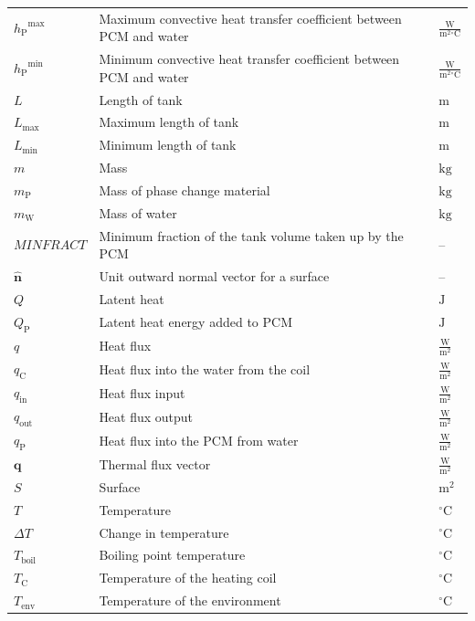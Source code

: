\documentclass[12pt]{article}
\begin{document}
\begin{longtabu}{l X[l] l}
\\
${{h_{\text{P}}}^{\text{max}}}$ & Maximum convective heat transfer coefficient between PCM and water & $\frac{\text{W}}{\text{m}^{2}{}^{\circ}\text{C}}$
\\
${{h_{\text{P}}}^{\text{min}}}$ & Minimum convective heat transfer coefficient between PCM and water & $\frac{\text{W}}{\text{m}^{2}{}^{\circ}\text{C}}$
\\
$L$ & Length of tank & ${\text{m}}$
\\
${L_{\text{max}}}$ & Maximum length of tank & ${\text{m}}$
\\
${L_{\text{min}}}$ & Minimum length of tank & ${\text{m}}$
\\
$m$ & Mass & ${\text{kg}}$
\\
${m_{\text{P}}}$ & Mass of phase change material & ${\text{kg}}$
\\
${m_{\text{W}}}$ & Mass of water & ${\text{kg}}$
\\
$MINFRACT$ & Minimum fraction of the tank volume taken up by the PCM & --
\\
$\symbf{\hat{n}}$ & Unit outward normal vector for a surface & --
\\
$Q$ & Latent heat & ${\text{J}}$
\\
${Q_{\text{P}}}$ & Latent heat energy added to PCM & ${\text{J}}$
\\
$q$ & Heat flux & $\frac{\text{W}}{\text{m}^{2}}$
\\
${q_{\text{C}}}$ & Heat flux into the water from the coil & $\frac{\text{W}}{\text{m}^{2}}$
\\
${q_{\text{in}}}$ & Heat flux input & $\frac{\text{W}}{\text{m}^{2}}$
\\
${q_{\text{out}}}$ & Heat flux output & $\frac{\text{W}}{\text{m}^{2}}$
\\
${q_{\text{P}}}$ & Heat flux into the PCM from water & $\frac{\text{W}}{\text{m}^{2}}$
\\
$\symbf{q}$ & Thermal flux vector & $\frac{\text{W}}{\text{m}^{2}}$
\\
$S$ & Surface & ${\text{m}^{2}}$
\\
$T$ & Temperature & ${{}^{\circ}\text{C}}$
\\
$ΔT$ & Change in temperature & ${{}^{\circ}\text{C}}$
\\
${T_{\text{boil}}}$ & Boiling point temperature & ${{}^{\circ}\text{C}}$
\\
${T_{\text{C}}}$ & Temperature of the heating coil & ${{}^{\circ}\text{C}}$
\\
${T_{\text{env}}}$ & Temperature of the environment & ${{}^{\circ}\text{C}}$

\end{longtabu}
\end{document}
